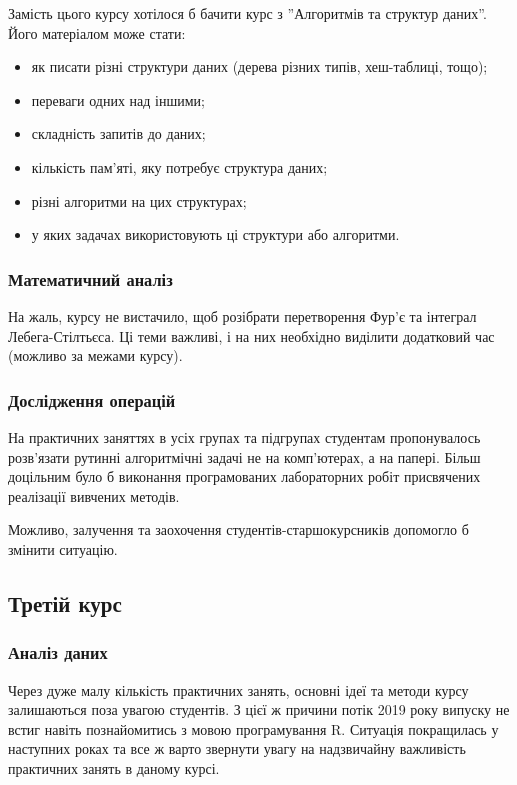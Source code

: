 \documentclass[14pt, a4paper]{extarticle}  %
\begin{document}
Замість цього курсу хотілося б бачити курс з ''Алгоритмів та структур даних''. Його матеріалом може стати: 
\begin{itemize}
    \item як писати різні структури даних (дерева різних типів, хеш-таблиці, тощо);
    \item переваги одних над іншими;
    \item складність запитів до даних; 
    \item кількість пам'яті, яку потребує структура даних; 
    \item різні алгоритми на цих структурах; 
    \item у яких задачах використовують ці структури або алгоритми.
\end{itemize}

\subsubsection{Математичний аналіз}

На жаль, курсу не вистачило, щоб розібрати перетворення Фур'є та інтеграл Лебега-Стілтьєса. Ці теми важливі, і на них необхідно виділити додатковий час (можливо за межами курсу). 

\subsubsection{Дослідження операцій}

На практичних заняттях в усіх групах та підгрупах студентам пропонувалось розв'язати рутинні алгоритмічні задачі не на комп'ю\-терах, а на папері. Більш доцільним було б виконання програмованих лабораторних робіт присвячених реалізації вивчених методів. 

Можливо, залучення та заохочення студентів-старшокурсників допомогло б змінити ситуацію. 

\subsection{Третій курс}
\subsubsection{Аналіз даних}

Через дуже малу кількість практичних занять, основні ідеї та методи курсу залишаються поза увагою студентів. З цієї ж причини потік 2019 року випуску не встиг навіть познайомитись з мовою програмування R. Ситуація покращилась у наступних роках та все ж варто звернути увагу на надзвичайну важливість практичних занять в даному курсі. 
\end{document}
